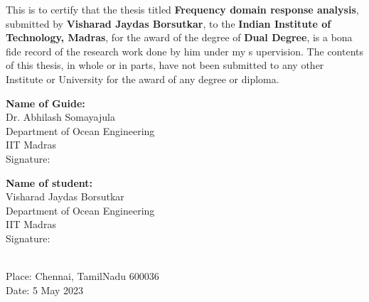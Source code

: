 \certificate


This is to certify that the thesis titled {\bf  Frequency domain response analysis}, 
submitted by {\bf Visharad Jaydas Borsutkar}, to the
 {\bf Indian Institute of Technology, Madras}, for the award of the degree of 
 {\bf Dual Degree}, is a bona fide record of the research work done by him under my s
 upervision. The contents of this thesis, in whole or in parts, have not been submitted 
 to any other Institute or University for the award of any degree or diploma.
\\[2.5cm]


\begin{minipage}[t]{0.50\textwidth}
    \textbf{Name of Guide:} \\
    Dr. Abhilash Somayajula\\
    Department of Ocean Engineering\\
    IIT Madras\\

    \vspace{1em}
    Signature:

\end{minipage}%
\hspace{1cm}
\begin{minipage}[t]{0.45\textwidth}
    \textbf{Name of student:} \\
    Visharad Jaydas Borsutkar \\
    Department of Ocean Engineering\\
    IIT Madras\\

    \vspace{1em}
    Signature:
\end{minipage}
\\[2cm]

\noindent Place: Chennai, TamilNadu 600036\\
Date: 5 May 2023  